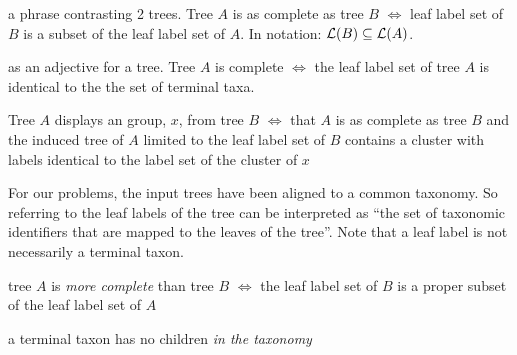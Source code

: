 \newcommand{\defitem}[2]{\item[{\bf #1}]\label{itm:#2} }
\begin{compactenum}
    \defitem{as complete}{defAsComplete} a phrase contrasting 2 trees.
    Tree $A$ is as complete as tree $B$ $\iff$
    leaf label set of $B$ is a subset of the leaf label set of $A$.
    In notation: $\mathcal{L}(B) \subseteq \mathcal{L}(A)$.
\defitem{complete}{defComplete} as an adjective for a tree. Tree $A$ is complete $\iff$ the leaf label set
    of tree $A$ is identical to the the set of terminal taxa.
\defitem{display}{defDisplay} Tree $A$ displays an group, $x$, from tree $B$ $\iff$
    that $A$ is as complete as tree $B$ and the induced tree of $A$ limited to the 
    leaf label set of $B$ contains a cluster with labels identical to the label set of the cluster of $x$
\defitem{leaf labels}{defLeafLabels} For our problems, the input trees have been aligned to a common
    taxonomy. So referring to the leaf labels of the tree can be interpreted as
    ``the set of taxonomic identifiers that are mapped to the leaves of the tree''.
    Note that a leaf label is not necessarily a terminal taxon.
\defitem{more complete}{defMoreComplete} tree $A$ is {\em more complete} than tree $B$ $\iff$ the leaf
    label set of $B$ is a proper subset of the leaf label set of $A$
    \defitem{terminal taxon}{defTerminalTaxon} a terminal taxon has no children {\em in the taxonomy}
\end{compactenum}
